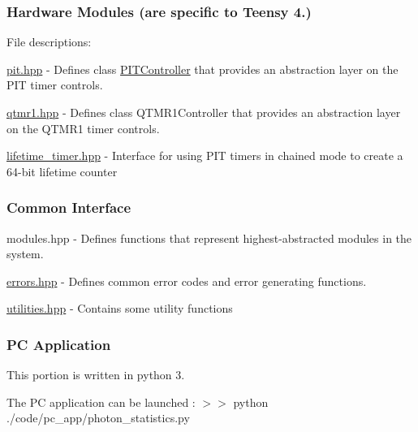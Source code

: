 \subsubsection*{Hardware Modules (are specific to Teensy 4.)}

File descriptions\+:


\begin{DoxyItemize}
\item {\ttfamily \hyperlink{pit_8hpp}{pit.\+hpp}} -\/ Defines {\ttfamily class \hyperlink{classPITController}{P\+I\+T\+Controller}} that provides an abstraction layer on the P\+IT timer controls.
\item {\ttfamily \hyperlink{qtmr1_8hpp}{qtmr1.\+hpp}} -\/ Defines \textquotesingle{}class Q\+T\+M\+R1\+Controller\textquotesingle{} that provides an abstraction layer on the Q\+T\+M\+R1 timer controls.
\item {\ttfamily \hyperlink{lifetime__timer_8hpp}{lifetime\+\_\+timer.\+hpp}} -\/ Interface for using P\+IT timers in chained mode to create a 64-\/bit lifetime counter
\end{DoxyItemize}

\subsubsection*{Common Interface}


\begin{DoxyItemize}
\item {\ttfamily modules.\+hpp} -\/ Defines functions that represent highest-\/abstracted modules in the system.
\item {\ttfamily \hyperlink{errors_8hpp}{errors.\+hpp}} -\/ Defines common error codes and error generating functions.
\item {\ttfamily \hyperlink{utilities_8hpp}{utilities.\+hpp}} -\/ Contains some utility functions
\end{DoxyItemize}

\subsubsection*{PC Application}

This portion is written in python 3.

The PC application can be launched \+: {\ttfamily $>$$>$ python ./code/pc\+\_\+app/photon\+\_\+statistics.py} 